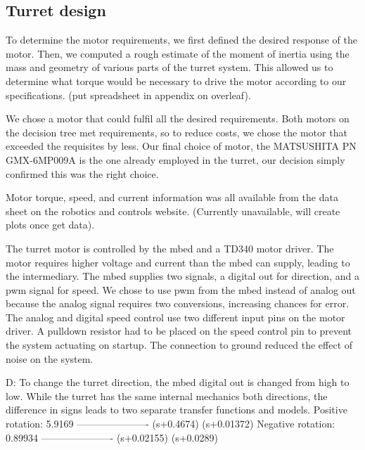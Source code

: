 ﻿\subsection{Turret design}

To determine the motor requirements, we first defined the desired response of the motor. Then, we computed a rough estimate of the moment of inertia using the mass and geometry of various parts of the turret system. This allowed us to determine what torque would be necessary to drive the motor according to our specifications. (put spreadsheet in appendix on overleaf).

We chose a motor that could fulfil all the desired requirements. Both motors on the decision tree met requirements, so to reduce costs, we chose the motor that exceeded the requisites by less. Our final choice of motor, the MATSUSHITA PN GMX-6MP009A is the one already employed in the turret, our decision simply confirmed this was the right choice. 

Motor torque, speed, and current information was all available from the data sheet on the robotics and controls website. (Currently unavailable, will create plots once get data).

The turret motor is controlled by the mbed and a TD340 motor driver. The motor requires higher voltage and current than the mbed can supply, leading to the intermediary. The mbed supplies two signals, a digital out for direction, and a pwm signal for speed. We chose to use pwm from the mbed instead of analog out because the analog signal requires two conversions, increasing chances for error. The analog and digital speed control use two different input pins on the motor driver. A pulldown resistor had to be placed on the speed control pin to prevent the system actuating on startup. The connection to ground reduced the effect of noise on the system.

D: To change the turret direction, the mbed digital out is changed from high to low. While the turret has the same internal mechanics both directions, the difference in signs leads to two separate transfer functions and models. Positive rotation:          5.9169
                               ----------------------
                               (s+0.4674) (s+0.01372) 
        Negative rotation:       0.89934
                            ----------------------
                             (s+0.02155) (s+0.0289)
